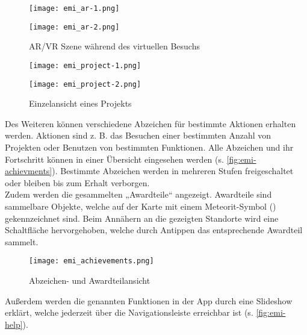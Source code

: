 \begin{figure}[htpb]
    \begin{minipage}{.5\textwidth}
        \centering
        \texttt{[image: emi\_ar-1.png]}
    \end{minipage}%
    \begin{minipage}{.5\textwidth}
        \centering
        \texttt{[image: emi\_ar-2.png]}
    \end{minipage}
    \caption{\ac{AR}/\ac{VR} Szene während des virtuellen Besuchs}
    \label{fig:emi-ar}
\end{figure}

\begin{figure}[htpb]
    \begin{minipage}{.5\textwidth}
        \centering
        \texttt{[image: emi\_project-1.png]}
    \end{minipage}%
    \begin{minipage}{.5\textwidth}
        \centering
        \texttt{[image: emi\_project-2.png]}
    \end{minipage}
    \caption{Einzelansicht eines Projekts}
    \label{fig:emi-project}
\end{figure}

Des Weiteren können verschiedene Abzeichen für bestimmte Aktionen erhalten
werden. Aktionen sind z. B. das Besuchen einer bestimmten Anzahl von Projekten
oder Benutzen von bestimmten Funktionen. Alle Abzeichen und ihr Fortschritt
können in einer Übersicht eingesehen werden (s. \autoref{fig:emi-achievments}).
Bestimmte Abzeichen werden in mehreren Stufen freigeschaltet oder bleiben bis
zum Erhalt verborgen. \\
Zudem werden die gesammelten „Awardteile“ angezeigt. Awardteile sind sammelbare
Objekte, welche auf der Karte mit einem Meteorit-Symbol
() gekennzeichnet sind. Beim Annähern an die
gezeigten Standorte wird eine Schaltfläche hervorgehoben, welche durch Antippen
das entsprechende Awardteil sammelt.

\begin{figure}[htpb]
    \centering
    \texttt{[image: emi\_achievements.png]}
    \caption{Abzeichen- und Awardteilansicht}
    \label{fig:emi-achievments}
\end{figure}

Außerdem werden die genannten Funktionen in der App durch eine Slideshow
erklärt, welche jederzeit über die Navigationsleiste erreichbar ist (s.
\autoref{fig:emi-help}).

